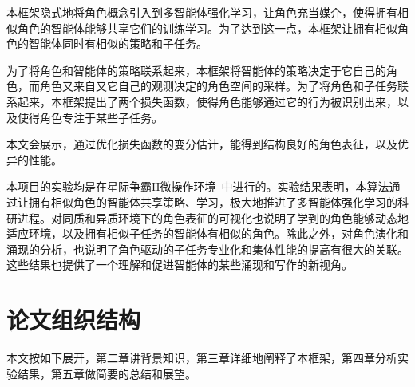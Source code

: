 本框架隐式地将角色概念引入到多智能体强化学习，让角色充当媒介，使得拥有相似角色的智能体能够共享它们的训练学习。为了达到这一点，本框架让拥有相似角色的智能体同时有相似的策略和子任务。

为了将角色和智能体的策略联系起来，本框架将智能体的策略决定于它自己的角色，而角色又来自又它自己的观测决定的角色空间的采样。为了将角色和子任务联系起来，本框架提出了两个损失函数，使得角色能够通过它的行为被识别出来，以及使得角色专注于某些子任务。

本文会展示，通过优化损失函数的变分估计，能得到结构良好的角色表征，以及优异的性能。

本项目的实验均是在星际争霸II微操作环境~\cite{vinyals2017starcraft, samvelyan2019starcraft}中进行的。实验结果表明，本算法通过让拥有相似角色的智能体共享策略、学习，极大地推进了多智能体强化学习的科研进程。对同质和异质环境下的角色表征的可视化也说明了学到的角色能够动态地适应环境，以及拥有相似子任务的智能体有相似的角色。除此之外，对角色演化和涌现的分析，也说明了角色驱动的子任务专业化和集体性能的提高有很大的关联。这些结果也提供了一个理解和促进智能体的某些涌现和写作的新视角。

\section{论文组织结构}
本文按如下展开，第二章讲背景知识，第三章详细地阐释了本框架，第四章分析实验结果，第五章做简要的总结和展望。